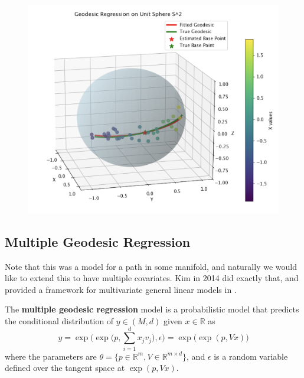 \begin{example}
    \begin{figure}[H]
      \centering  
      \includegraphics[scale=0.4]{img/geodesic_sphere.png}
      \caption{} 
    \end{figure}
  \end{example}

\subsection{Multiple Geodesic Regression} 

  Note that this was a model for a path in some manifold, and naturally we would like to extend this to have multiple covariates. Kim in 2014 did exactly that, and provided a framework for multivariate general linear models in \cite{2014kim}.  

  \begin{definition} 
    The \textbf{multiple geodesic regression} model is a probabilistic model that predicts the conditional distribution of $y \in (M, d)$ given $x \in \mathbb{R}$ as 
    \begin{equation}
      y = \exp \bigg( \exp \Big( p, \sum_{i=1}^d x_j v_j \Big), \epsilon \bigg) = \exp \big( \exp (p, V x)\big)
    \end{equation} 
    where the parameters are $\theta = \{p \in \mathbb{R}^m, V \in \mathbb{R}^{m \times d}\}$, and $\epsilon$ is a random variable defined over the tangent space at $\exp(p, Vx)$. 
  \end{definition} 

